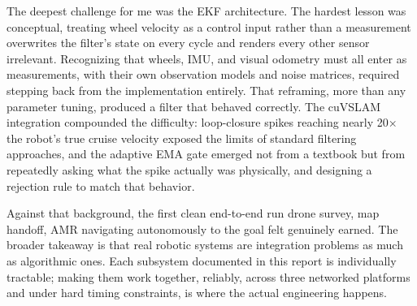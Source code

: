 \documentclass[11pt]{article}
\begin{document}
The deepest challenge for me was the EKF architecture. The hardest lesson was conceptual, treating wheel velocity as a control input rather than a measurement overwrites the filter's state on every cycle and renders every other sensor irrelevant. Recognizing that wheels, IMU, and visual odometry must all enter as measurements, with their own observation models and noise matrices, required stepping back from the implementation entirely. That reframing, more than any parameter tuning, produced a filter that behaved correctly. The cuVSLAM integration compounded the difficulty: loop-closure spikes reaching nearly 20× the robot's true cruise velocity exposed the limits of standard filtering approaches, and the adaptive EMA gate emerged not from a textbook but from repeatedly asking what the spike actually was physically, and designing a rejection rule to match that behavior.

Against that background, the first clean end-to-end run drone survey, map handoff, AMR navigating autonomously to the goal felt genuinely earned. The broader takeaway is that real robotic systems are integration problems as much as algorithmic ones. Each subsystem documented in this report is individually tractable; making them work together, reliably, across three networked platforms and under hard timing constraints, is where the actual engineering happens.
\vspace{4em}
\end{document}
